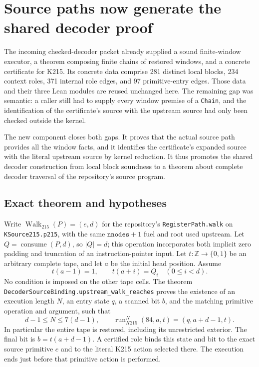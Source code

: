 \section{Source paths now generate the shared decoder proof}
\label{sec:decoder-source-paths}

The incoming checked-decoder packet already supplied a sound finite-window
executor, a theorem composing finite chains of restored windows, and a concrete
certificate for K215. Its concrete data comprise 281 distinct local blocks,
234 context roles, 371 internal role edges, and 97 primitive-entry edges.
Those data and their three Lean modules are reused unchanged here. The
remaining gap was semantic: a caller still had to supply every window premise
of a \texttt{Chain}, and the identification of the certificate's source with
the upstream source had only been checked outside the kernel.

The new component closes both gaps. It proves that the actual source path
provides all the window facts, and it identifies the certificate's expanded
source with the literal upstream source by kernel reduction. It thus promotes
the shared decoder construction from local block soundness to a theorem about
complete decoder traversal of the repository's source program.

\subsection{Exact theorem and hypotheses}

Write $\operatorname{Walk}_{215}(P)=(e,d)$ for the repository's
\texttt{RegisterPath.walk} on \texttt{KSource215.p215}, with the same
$\texttt{nnodes}+1$ fuel and root used upstream. Let
$Q=\operatorname{consume}(P,d)$, so $|Q|=d$; this operation incorporates both
implicit zero padding and truncation of an instruction-pointer input.
Let $t:\mathbb Z\to\{0,1\}$ be an arbitrary complete tape, and let $a$ be the
initial head position. Assume
\[
 t(a-1)=1,\qquad t(a+i)=Q_i\quad(0\leq i<d).
\]
No condition is imposed on the other tape cells. The theorem
\texttt{DecoderSourceBinding.}\allowbreak\texttt{upstream\_walk\_reaches} proves the existence of
an execution length $N$, an entry state $q$, a scanned bit $b$, and the matching
primitive operation and argument, such that
\[
 d-1\leq N\leq 7(d-1),\qquad
 \operatorname{run}_{K215}^{N}(84,a,t)
   =(q,a+d-1,t).
\]
In particular the entire tape is restored, including its unrestricted
exterior. The final bit is $b=t(a+d-1)$. A certified role binds this state and
bit to the exact source primitive $e$ and to the literal K215 action selected
there. The execution ends just before that primitive action is performed.


